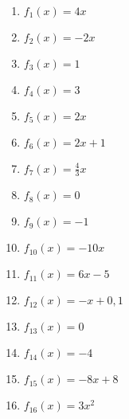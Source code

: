 \begin{Answer}[ref=momAllgA1]\\
	\begin{minipage}{\textwidth}
		\begin{minipage}{0.49\textwidth}
			\begin{enumerate}[label=\alph*)]
				\item \(f_1(x)=4x\)
				\item \(f_2(x)=-2x\)
				\item \(f_3(x)=1\)
				\item \(f_4(x)=3\)
				\item \(f_5(x)=2x\)
				\item \(f_6(x)=2x+1\)
				\item \(f_7(x)=\frac{4}{3}x\)
				\item \(f_8(x)=0\)
			\end{enumerate}
		\end{minipage}
		\begin{minipage}{0.49\textwidth}
			\begin{enumerate}[label=\alph*)]
				\setcounter{enumi}{8}
				\item \(f_9(x)=-1\)
				\item \(f_{10}(x)=-10x\)
				\item \(f_{11}(x)=6x-5\)
				\item \(f_{12}(x)=-x+0,1\)
				\item \(f_{13}(x)=0\)
				\item \(f_{14}(x)=-4\)
				\item \(f_{15}(x)=-8x+8\)
				\item \(f_{16}(x)=3x^2\)
			\end{enumerate}
		\end{minipage}
	\end{minipage}
\end{Answer}

